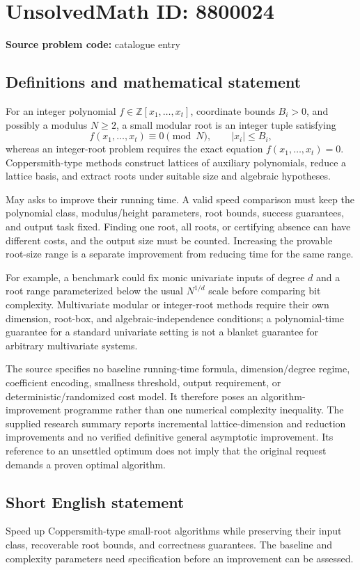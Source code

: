 \documentclass[11pt]{article}
\newcommand{\Z}{\mathbb{Z}}
\begin{document}
\section*{UnsolvedMath ID: 8800024}
\textbf{Source problem code:} catalogue entry
\subsection{Definitions and mathematical statement}
For an integer polynomial \(f\in\Z[x_1,\ldots,x_t]\), coordinate bounds \(B_i>0\), and possibly a modulus \(N\ge2\), a small modular root is an integer tuple satisfying
\[
f(x_1,\ldots,x_t)\equiv0\pmod N,
\qquad |x_i|\le B_i,
\]
whereas an integer-root problem requires the exact equation \(f(x_1,\ldots,x_t)=0\). Coppersmith-type methods construct lattices of auxiliary polynomials, reduce a lattice basis, and extract roots under suitable size and algebraic hypotheses.

May asks to improve their running time. A valid speed comparison must keep the polynomial class, modulus/height parameters, root bounds, success guarantees, and output task fixed. Finding one root, all roots, or certifying absence can have different costs, and the output size must be counted. Increasing the provable root-size range is a separate improvement from reducing time for the same range.

For example, a benchmark could fix monic univariate inputs of degree \(d\) and a root range parameterized below the usual \(N^{1/d}\) scale before comparing bit complexity. Multivariate modular or integer-root methods require their own dimension, root-box, and algebraic-independence conditions; a polynomial-time guarantee for a standard univariate setting is not a blanket guarantee for arbitrary multivariate systems.

The source specifies no baseline running-time formula, dimension/degree regime, coefficient encoding, smallness threshold, output requirement, or deterministic/randomized cost model. It therefore poses an algorithm-improvement programme rather than one numerical complexity inequality. The supplied research summary reports incremental lattice-dimension and reduction improvements and no verified definitive general asymptotic improvement. Its reference to an unsettled optimum does not imply that the original request demands a proven optimal algorithm.
\subsection{Short English statement}
Speed up Coppersmith-type small-root algorithms while preserving their input class, recoverable root bounds, and correctness guarantees. The baseline and complexity parameters need specification before an improvement can be assessed.
\end{document}
